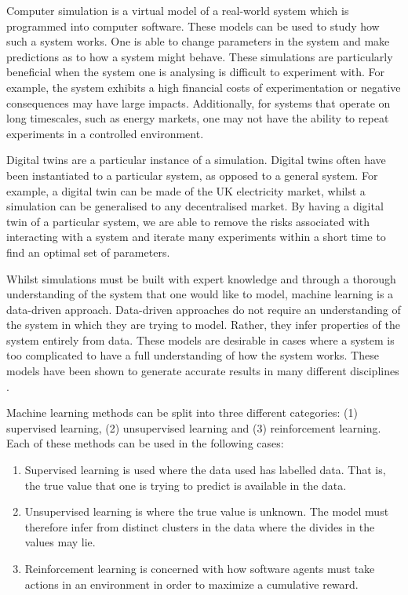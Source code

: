 Computer simulation is a virtual model of a real-world system which is programmed into computer software. These models can be used to study how such a system works. One is able to change parameters in the system and make predictions as to how a system might behave. These simulations are particularly beneficial when the system one is analysing is difficult to experiment with. For example, the system exhibits a high financial costs of experimentation or negative consequences may have large impacts. Additionally, for systems that operate on long timescales, such as energy markets, one may not have the ability to repeat experiments in a controlled environment.

Digital twins are a particular instance of a simulation. Digital twins often have been instantiated to a particular system, as opposed to a general system. For example, a digital twin can be made of the UK electricity market, whilst a simulation can be generalised to any decentralised market. By having a digital twin of a particular system, we are able to remove the risks associated with interacting with a system and iterate many experiments within a short time to find an optimal set of parameters. 

Whilst simulations must be built with expert knowledge and through a thorough understanding of the system that one would like to model, machine learning is a data-driven approach. Data-driven approaches do not require an understanding of the system in which they are trying to model. Rather, they infer properties of the system entirely from data. These models are desirable in cases where a system is too complicated to have a full understanding of how the system works. These models have been shown to generate accurate results in many different disciplines \cite{WarrenLiao2005,Wiens2009,Covington2016}.

Machine learning methods can be split into three different categories: (1) supervised learning, (2) unsupervised learning and (3) reinforcement learning. Each of these methods can be used in the following cases:

\begin{enumerate}
	\item Supervised learning is used where the data used has labelled data. That is, the true value that one is trying to predict is available in the data.
	\item Unsupervised learning is where the true value is unknown. The model must therefore infer from distinct clusters in the data where the divides in the values may lie.
	\item Reinforcement learning is concerned with how software agents must take actions in an environment in order to maximize a cumulative reward.
\end{enumerate}

